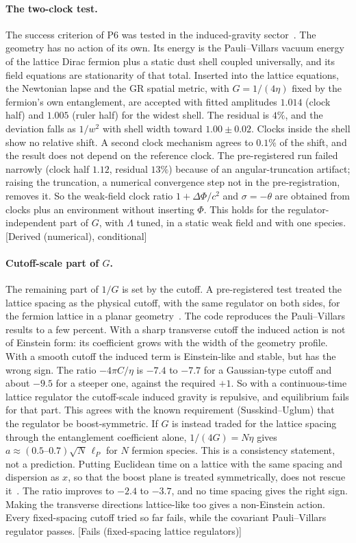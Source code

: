 \documentclass[11pt]{article}
\newcommand{\st}[1]{\textsf{\small[#1]}}
\theoremstyle{plain}
\theoremstyle{definition}
\theoremstyle{remark}
\begin{document}
\paragraph{The two-clock test.}
The success criterion of P6 was tested in the induced-gravity sector~\cite{JordanNote12}. The geometry has no action of its own. Its energy is the Pauli--Villars vacuum energy of the lattice Dirac fermion plus a static dust shell coupled universally, and its field equations are stationarity of that total. Inserted into the lattice equations, the Newtonian lapse and the GR spatial metric, with $G=1/(4\eta)$ fixed by the fermion's own entanglement, are accepted with fitted amplitudes $1.014$ (clock half) and $1.005$ (ruler half) for the widest shell. The residual is $4\%$, and the deviation falls as $1/w^2$ with shell width toward $1.00\pm0.02$. Clocks inside the shell show no relative shift. A second clock mechanism agrees to $0.1\%$ of the shift, and the result does not depend on the reference clock. The pre-registered run failed narrowly (clock half $1.12$, residual $13\%$) because of an angular-truncation artifact; raising the truncation, a numerical convergence step not in the pre-registration, removes it. So the weak-field clock ratio $1+\Delta\Phi/c^2$ and $\sigma=-\theta$ are obtained from clocks plus an environment without inserting $\Phi$. This holds for the regulator-independent part of $G$, with $\Lambda$ tuned, in a static weak field and with one species. \st{Derived (numerical), conditional}

\paragraph{Cutoff-scale part of $G$.}
The remaining part of $1/G$ is set by the cutoff. A pre-registered test treated the lattice spacing as the physical cutoff, with the same regulator on both sides, for the fermion lattice in a planar geometry~\cite{JordanNote7}. The code reproduces the Pauli--Villars results to a few percent. With a sharp transverse cutoff the induced action is not of Einstein form: its coefficient grows with the width of the geometry profile. With a smooth cutoff the induced term is Einstein-like and stable, but has the wrong sign. The ratio $-4\pi C/\eta$ is $-7.4$ to $-7.7$ for a Gaussian-type cutoff and about $-9.5$ for a steeper one, against the required $+1$. So with a continuous-time lattice regulator the cutoff-scale induced gravity is repulsive, and equilibrium fails for that part. This agrees with the known requirement (Susskind--Uglum) that the regulator be boost-symmetric. If $G$ is instead traded for the lattice spacing through the entanglement coefficient alone, $1/(4G)=N\eta$ gives $a\approx(0.5\text{--}0.7)\sqrt{N}\,\ell_P$ for $N$ fermion species. This is a consistency statement, not a prediction. Putting Euclidean time on a lattice with the same spacing and dispersion as $x$, so that the boost plane is treated symmetrically, does not rescue it~\cite{JordanNote8}. The ratio improves to $-2.4$ to $-3.7$, and no time spacing gives the right sign. Making the transverse directions lattice-like too gives a non-Einstein action. Every fixed-spacing cutoff tried so far fails, while the covariant Pauli--Villars regulator passes. \st{Fails (fixed-spacing lattice regulators)}
\end{document}
